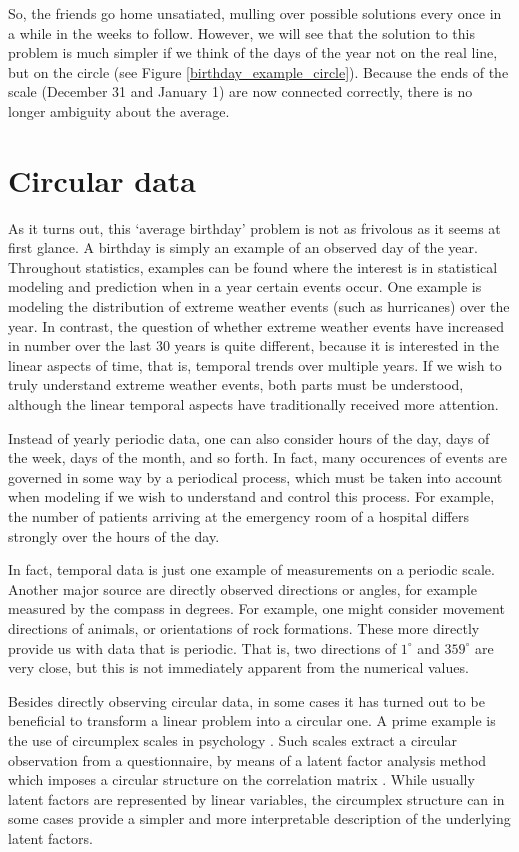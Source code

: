 \documentclass[12pt, a4paper]{book}\usepackage[]{graphicx}\usepackage[]{color}
\begin{document}
So, the friends go home unsatiated, mulling over possible solutions every once in a while in the weeks to follow. However, we will see that the solution to this problem is much simpler if we think of the days of the year not on the real line, but on the circle (see Figure \ref{birthday_example_circle}). Because the ends of the scale (December 31 and January 1) are now connected correctly, there is no longer ambiguity about the average.


\section*{Circular data}

As it turns out, this `average birthday' problem is not as frivolous as it seems at first glance.  A birthday is simply an example of an observed day of the year. Throughout statistics, examples can be found where the interest is in statistical modeling and prediction when in a year certain events occur. One example is modeling the distribution of extreme weather events (such as hurricanes) over the year. In contrast, the question of whether extreme weather events have increased in number over the last 30 years is quite different, because it is interested in the linear aspects of time, that is, temporal trends over multiple years. If we wish to truly understand extreme weather events, both parts must be understood, although the linear temporal aspects have traditionally received more attention.

Instead of yearly periodic data, one can also consider hours of the day, days of the week, days of the month, and so forth. In fact, many occurences of events are governed in some way by a periodical process, which must be taken into account when modeling if we wish to understand and control this process. For example, the number of patients arriving at the emergency room of a hospital differs strongly over the hours of the day.

In fact, temporal data is just one example of measurements on a periodic scale. Another major source are directly observed directions or angles, for example measured by the compass in degrees. For example, one might consider movement directions of animals, or orientations of rock formations. These more directly provide us with data that is periodic. That is, two directions of $1^\circ$ and $359^\circ$ are very close, but this is not immediately apparent from the numerical values.

Besides directly observing circular data, in some cases it has turned out to be beneficial to transform a linear problem into a circular one. A prime example is the use of circumplex scales in psychology \citep{gurtmancircumplex}. Such scales extract a circular observation from a questionnaire, by means of a latent factor analysis method which imposes a circular structure on the correlation matrix \citep{browne1992circumplex}. While usually latent factors are represented by linear variables, the circumplex structure can in some cases provide a simpler and more interpretable description of the underlying latent factors.
\end{document}
